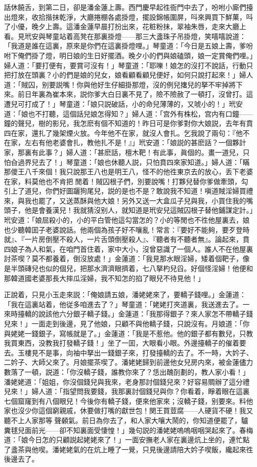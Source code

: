 話休饒舌，到第二日，卻是潘金蓮上壽。西門慶早起徃衙門中去了，吩咐小廝們擡出燈來，收拾揩抹乾淨，大廳捲棚各處掛燈，擺設錦帳圍屏，呌來興買下鮮菓，呌了小優，晚夕上壽。這潘金蓮早晨打扮出來，花粧粉抹，翠袖朱唇，走來大廳上看。見玳安與琴童站着高凳在那裏掛燈——那三大盞珠子吊掛燈，笑嘻嘻說道：「我道是誰在這裏，原來是你們在這裏掛燈哩。」琴童道：「今日是五娘上壽，爹吩咐下俺們掛了燈，明日娘的生日好擺酒。晚夕小的們與娘磕頭，娘一定賞俺們哩。」婦人道：「要打便有，要賞可沒有！」琴童道：「耶嚛！娘怎的沒打不說話，行動只把打放在頭裏？小的們是娘的兒女，娘看顧看顧兒便好，如何只說打起來！」婦人道：「賊囚，别要説嘴！你與他好生仔細掛那燈，沒的例兒撦兒的拏不牢掉將下來。前日年裏為崔本來，説你爹大白日裏不見了，險不險赦了一頓打，沒曾打。這遭兒可打成了！」琴童道：「娘只説破話，小的命兒薄薄的，又唬小的！」玳安道：「娘也不打聽，這個話兒娘怎得知？」婦人道：「宫外有株松，宫内有口鐘——鐘的聲兒，樹的影兒，我怎麽有個不知道的！昨日可是你爹對你大娘説，去年有賁四在家，還扎了幾架煙火放。今年他不在家，就沒人會扎。乞我說了兩句：『他不在家，左右有他老婆會扎，教他扎不是！』」玳安道：「娘説的甚麽話？一個夥計家，那裏有此事？」婦人道：「甚麽話，檀木靶！有此事，眞個的。畫一道兒，只怕㒲過界兒去了！」琴童道：「娘也休聽人説，只怕賁四來家知道。」婦人道：「瞞那儍王八千來個！我只說那王八也是明王八，怪不的他徃東京去的放心，丢下老婆在家，料莫他也不肯把𣭈閒着！賊囚根子們，別要說嘴！打夥兒替你爹做牽頭，勾引上了道兒，你們好圖躧狗尾兒，説的是也不是？敢說我不知道！嗔道賊淫婦買禮來，與我也罷了，又送蒸酥與他大娘！另外又送一大盒瓜子兒與我，小買住我的嘴頭子，他是會養漢兒！我就猜沒别人，就知道是玳安兒這賊囚根子替他鋪謀定計。」玳安道：「娘屈殺小的，小的平白管他這勾當怎的？小的等閒也不徃他屋裏去，娘也少聽韓囬子老婆說話。他兩個為孩子好不嚷亂！常言：『要好不能夠，要歹登時就』、『一片房倒壓不殺人，一片舌頭倒壓殺人』、『聽者有不聽者無』。論起來，賁四娘子為人和氣，在咱門首住着，家中大小，沒曾惡識了一個人。誰人不在他屋裏討茶喫？莫不都養着，倒沒放處！」金蓮道：「我見那水眼淫婦，矮着個靶子，像是半頭磚兒也似的個兒，把那水濟濟眼擠着，七八拏杓兒舀。好個怪淫婦！他便和那韓道國老婆那長大摔瓜淫婦，我不知怎的掐了眼兒不待見他！」

正說着，只見小玉走來説：「俺娘請五娘，潘姥姥來了，要轎子錢哩。」金蓮道：「我在這裏站着，他従多咱進去了？」琴童道：「姥姥打夾道裏，我送進去了。一來時擡轎的說該他六分銀子轎子錢。」金蓮道：「我那得銀子？來人家怎不帶轎子錢兒來！」一面走到後邊，見了他娘，只顧不與他轎子錢，只說沒有。月娘道：「你與姥姥一錢銀子，寫帳就是了。」金蓮道：「我是不惹他。他的銀子都有數兒，只教我買東西，没教我打發轎子錢！」坐了一囬，大眼看小眼。外邊擡轎子的催着要去。玉樓見不是事，向袖中拏出一錢銀子來，打發擡轎的去了。不一時，大妗子、二妗子、大師父來了。月娘擺茶喫了。潘姥姥歸到前邊他女兒房内來，被金蓮儘力數落了一頓，説道：「你沒轎子錢，誰教你來了？恁出醜㓦劃的，教人家小看！」潘姥姥道：「姐姐，你沒個錢兒與我來，老身那討個錢兒來？好容易賙辦了這分禮兒來！」婦人道：「指望問我要錢，我那裏討個錢兒與你？你看着，睜着眼在這裏七個窟窿到有八個眼兒！今後你有轎子錢，便來他家來；沒轎子錢，别要來。料他家也沒少你這個窮親戚，休要做打嘴的獻世包！関王買荳腐——人硬貨不硬！我又聽不上人家那等𣭈聲顙氣。前日為你去了，和人家大嚷大鬧的，你知道便罷了，驢糞毬兒面前光——卻不知裏面受悽惶！」幾句説的潘姥姥嗚嗚咽咽哭起來了。春梅道：「娘今日怎的只顧説起姥姥來了！」一面安撫老人家在裏邊炕上坐的，連忙點了盞茶與他喫。潘姥姥氣的在炕上睡了一覺，只見後邊請陪大妗子喫飯，纔起來徃後邊去了。

